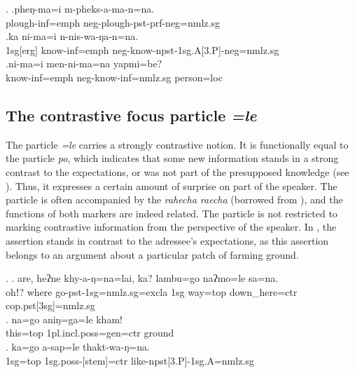 \ex. \ag.pheŋ-ma=i              m-pheks-a-ma-n=na.\\
plough{\sc -inf=emph} {\sc neg-}plough{\sc [3sg]-pst-prf-neg=nmlz.sg}\\
\bg.ka  ni-ma=i          n-nis-wa-ŋa-n=na.\\
{\sc 1sg[erg]} know{\sc -inf=emph} {\sc neg-}know{\sc -npst-1sg.A[3.P]-neg=nmlz.sg}\\
\bg.ni-ma=i          men-ni-ma=na              yapmi=be?\\
know{\sc -inf=emph} {\sc neg-}know{\sc -inf=nmlz.sg} person{\sc =loc}\\
 
 
\subsection{The contrastive focus particle \emph{=le}}
   
The particle  \emph{=le} carries a strongly contrastive notion. It is functionally equal to the  particle \emph{po}, which indicates that some new information stands in a strong contrast to the expectations, or was not part of the presupposed knowledge (see \Next[a]). Thus, it expresses a certain amount of surprise on part of the speaker. The particle is often accompanied by the  \emph{rahecha \ti raecha} (borrowed from ), and the functions of both markers are indeed related. The particle is not restricted to marking contrastive information from the perspective of the speaker. In \Next[b], the assertion stands in contrast to the adressee's expectations, as this assertion belongs to an argument about a particular patch of farming ground. 

\ex. \ag. are,   heʔne khy-a-ŋ=na=lai,        ka? lambu=go     naʔmo=le             sa=na.\\
ohǃ?  where  go{\sc -pst-1sg=nmlz.sg=excla} {\sc 1sg} way{\sc =top} down\_here{\sc =ctr} {\sc cop.pst[3sg]=nmlz.sg}\\
\bg. na=go       aniŋ=ga=le   kham!\\
this{\sc =top} {\sc 1pl.incl.poss=gen=ctr} ground\\
 
\bg. ka=go a-sap=le thakt-wa-ŋ=na.\\
{\sc 1sg=top} {\sc 1sg.poss-[stem]=ctr} like{\sc -npst[3.P]-1sg.A=nmlz.sg}\\

